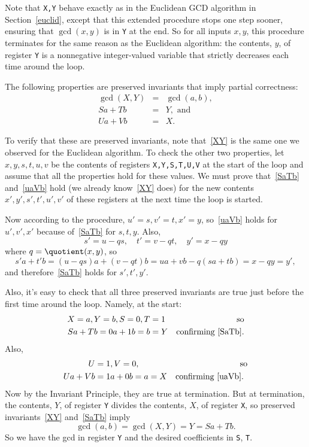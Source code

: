 Note that \texttt{X,Y} behave exactly as in the Euclidean GCD algorithm in
Section~\ref{euclid}, except that this extended procedure stops one step
sooner, ensuring that $\gcd(x,y)$ is in \texttt{Y} at the end.  So for all
inputs $x,y$, this procedure terminates for the same reason as the
Euclidean algorithm: the contents, $y$, of register \texttt{Y} is a
nonnegative integer-valued variable that strictly decreases each time
around the loop.

The following properties are preserved invariants that imply partial
correctness:
\begin{eqnarray}
\gcd(X,Y) &=& \gcd(a,b), \label{XY}\\
Sa+Tb &=& Y,\text{ and }\label{SaTb}\\
Ua+Vb &=& X. \label{uaVb}
\end{eqnarray}

To verify that these are preserved invariants, note that~\eqref{XY} is the
same one we observed for the Euclidean algorithm.  To check the other two
properties, let $x,y,s,t,u,v$ be the contents of registers
\texttt{X,Y,S,T,U,V} at the start of the loop and assume that all the
properties hold for these values.  We must prove that~\eqref{SaTb}
and~\eqref{uaVb} hold (we already know~\eqref{XY} does) for the new
contents $x',y',s',t',u',v'$ of these registers at the next time the loop
is started.

Now according to the procedure, $u'=s,v'=t,x'=y$, so~\eqref{uaVb} holds
for $u',v',x'$ because of~\eqref{SaTb} for $s,t,y$.  Also, 
\[
s'= u - qs,\quad t'= v - qt,\quad y' = x - qy
\]
where $q = \quotient(x,y)$,
so
\[
s'a+t'b = (u-qs)a + (v-qt)b =ua+vb - q(sa+tb) = x - qy = y',
\]
and therefore~\eqref{SaTb} holds for $s',t',y'$.

Also, it's easy to check that all three preserved invariants are true just
before the first time around the loop.  Namely, at the start:
\begin{align*}
X      =a, Y=b,S=0, T& =1 & \mbox{so}\\
Sa+Tb = 0a+1b=b& =Y & \mbox{confirming~\eqref{SaTb}.}
\end{align*}
Also,
\begin{align*}
U     & =1, V=0, & \mbox{so} \\
Ua+Vb & = 1a+0b=a =X & \mbox{confirming~\eqref{uaVb}.  }
\end{align*}
Now by the Invariant Principle, they are true at termination.  But at
termination, the contents, $Y$, of register \texttt{Y} divides the
contents, $X$, of register \texttt{X}, so preserved invariants~\eqref{XY}
and~\eqref{SaTb} imply
\[
\gcd(a,b) = \gcd(X,Y) = Y = Sa + Tb.
\]
So we have the gcd in register \texttt{Y} and the desired coefficients in
\texttt{S}, \texttt{T}.

